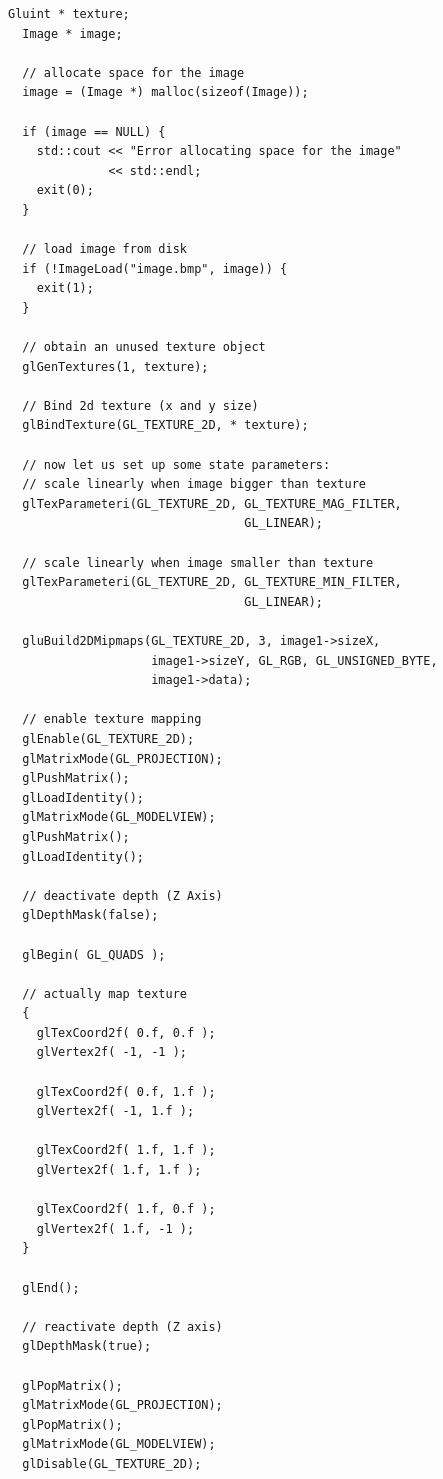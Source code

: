 \begin{lstlisting}[caption={Texture example}, label={code:texturemapping}, frame=trBL]
  Gluint * texture;
  Image * image;
    
  // allocate space for the image
  image = (Image *) malloc(sizeof(Image));

  if (image == NULL) {
    std::cout << "Error allocating space for the image"
              << std::endl;
    exit(0);
  }

  // load image from disk
  if (!ImageLoad("image.bmp", image)) {
    exit(1);
  }        

  // obtain an unused texture object
  glGenTextures(1, texture);

  // Bind 2d texture (x and y size)
  glBindTexture(GL_TEXTURE_2D, * texture);   

  // now let us set up some state parameters:
  // scale linearly when image bigger than texture
  glTexParameteri(GL_TEXTURE_2D, GL_TEXTURE_MAG_FILTER,
                                 GL_LINEAR);
 
  // scale linearly when image smaller than texture
  glTexParameteri(GL_TEXTURE_2D, GL_TEXTURE_MIN_FILTER,
                                 GL_LINEAR); 

  gluBuild2DMipmaps(GL_TEXTURE_2D, 3, image1->sizeX, 
                    image1->sizeY, GL_RGB, GL_UNSIGNED_BYTE, 
                    image1->data);

  // enable texture mapping
  glEnable(GL_TEXTURE_2D);
  glMatrixMode(GL_PROJECTION);
  glPushMatrix();
  glLoadIdentity();
  glMatrixMode(GL_MODELVIEW);
  glPushMatrix();
  glLoadIdentity();

  // deactivate depth (Z Axis)
  glDepthMask(false);

  glBegin( GL_QUADS );

  // actually map texture
  {
    glTexCoord2f( 0.f, 0.f );
    glVertex2f( -1, -1 );

    glTexCoord2f( 0.f, 1.f );
    glVertex2f( -1, 1.f );

    glTexCoord2f( 1.f, 1.f );
    glVertex2f( 1.f, 1.f );

    glTexCoord2f( 1.f, 0.f );
    glVertex2f( 1.f, -1 );
  }

  glEnd();

  // reactivate depth (Z axis)
  glDepthMask(true);

  glPopMatrix();
  glMatrixMode(GL_PROJECTION);
  glPopMatrix();
  glMatrixMode(GL_MODELVIEW);
  glDisable(GL_TEXTURE_2D);
\end{lstlisting}
%
